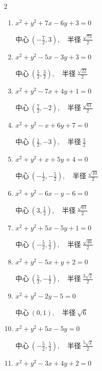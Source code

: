 \begin{multicols}{2}
\begin{enumerate}
\resetques

  \item $x^{2}+y^{2}+7x-6y+3=0$

        $\displaystyle 中心\: \left(-\frac{7}{2},3\right), \quad 半径 \ \frac{\sqrt{73}}{2}$

  \item $x^{2}+y^{2}-5x-3y+3=0$

        $\displaystyle 中心\: \left(\frac{5}{2},\frac{3}{2}\right), \quad 半径 \ \frac{\sqrt{22}}{2}$

  \item $x^{2}+y^{2}-7x+4y+1=0$

        $\displaystyle 中心\: \left(\frac{7}{2},-2\right), \quad 半径 \ \frac{\sqrt{61}}{2}$

  \item $x^{2}+y^{2}-x+6y+7=0$

        $\displaystyle 中心\: \left(\frac{1}{2},-3\right), \quad 半径 \ \frac{3}{2}$

  \item $x^{2}+y^{2}+x+5y+4=0$

        $\displaystyle 中心\: \left(-\frac{1}{2},-\frac{5}{2}\right), \quad 半径 \ \frac{\sqrt{10}}{2}$

  \item $x^{2}+y^{2}-6x-y-6=0$

        $\displaystyle 中心\: \left(3,\frac{1}{2}\right), \quad 半径 \ \frac{\sqrt{61}}{2}$

  \item $x^{2}+y^{2}+5x-5y+1=0$

        $\displaystyle 中心\: \left(-\frac{5}{2},\frac{5}{2}\right), \quad 半径 \ \frac{\sqrt{46}}{2}$

  \item $x^{2}+y^{2}-5x+y+2=0$

        $\displaystyle 中心\: \left(\frac{5}{2},-\frac{1}{2}\right), \quad 半径 \ \frac{3\sqrt{2}}{2}$

  \item $x^{2}+y^{2}-2y-5=0$

        $\displaystyle 中心\: \left(0,1\right), \quad 半径 \ \sqrt{6}$

  \item $x^{2}+y^{2}+5x-5y=0$

        $\displaystyle 中心\: \left(-\frac{5}{2},\frac{5}{2}\right), \quad 半径 \ \frac{5\sqrt{2}}{2}$

  \item $x^{2}+y^{2}-3x+4y+2=0$


\end{enumerate}
\end{multicols}
